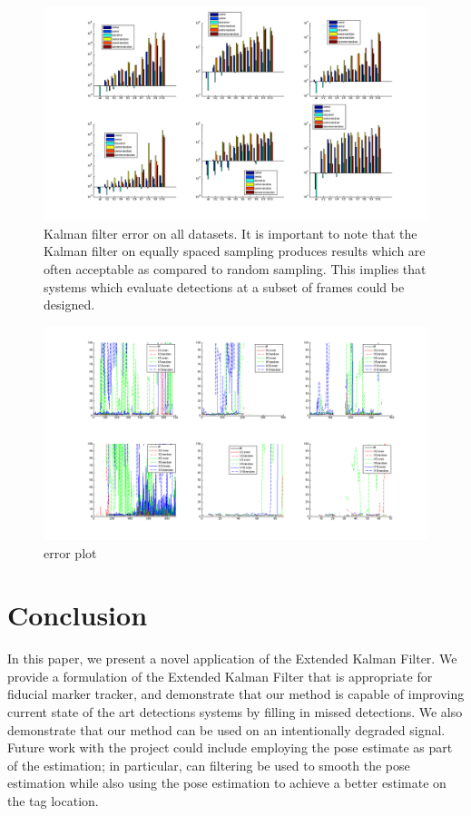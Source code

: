 \documentclass[letterpaper,10pt,conference]{IEEEtran}
\begin{document}
\begin{figure}
\includegraphics[scale=.3]{kalman}
\caption{Kalman filter error on all datasets.  It is important to note that the Kalman filter on equally spaced sampling produces results which are often acceptable as compared to random sampling. This implies that systems which evaluate detections at a subset of frames could be designed.}
\label{fig:kalman_error}
\end{figure}



\begin{figure}
\includegraphics[scale=.3]{Corner_error}
\caption{error plot}
\label{fig:error_plot}
\end{figure}



\section{Conclusion}
\label{sec:conclusion}
In this paper, we present a novel application of the Extended Kalman Filter. We provide a formulation of the Extended Kalman Filter that is appropriate for fiducial marker tracker, and demonstrate that our method is capable of improving current state of the art detections systems by filling in missed detections. We also demonstrate that our method can be used on an intentionally degraded signal. Future work with the project could include employing the pose estimate as part of the estimation; in particular, can filtering be used to smooth the pose estimation while also using the pose estimation to achieve a better estimate on the tag location.
\end{document}
